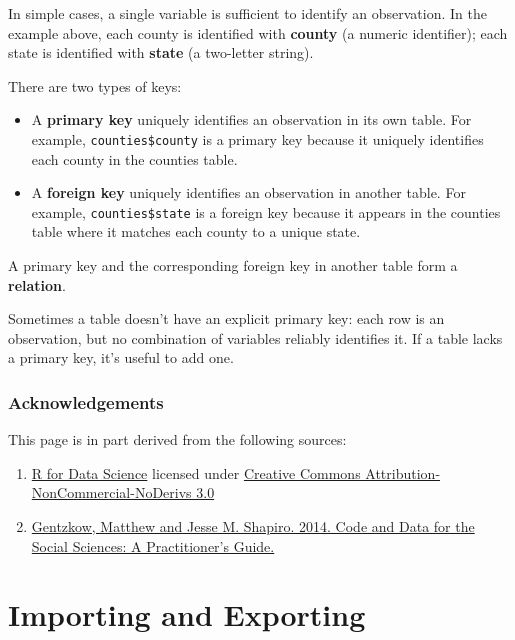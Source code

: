 \documentclass[]{book}
\begin{document}
In simple cases, a single variable is sufficient to identify an
observation. In the example above, each county is identified with
\textbf{county} (a numeric identifier); each state is identified with
\textbf{state} (a two-letter string).

There are two types of keys:

\begin{itemize}
\item
  A \textbf{primary key} uniquely identifies an observation in its own
  table. For example, \texttt{counties\$county} is a primary key because
  it uniquely identifies each county in the counties table.
\item
  A \textbf{foreign key} uniquely identifies an observation in another
  table. For example, \texttt{counties\$state} is a foreign key because
  it appears in the counties table where it matches each county to a
  unique state.
\end{itemize}

A primary key and the corresponding foreign key in another table form a
\textbf{relation}.

Sometimes a table doesn't have an explicit primary key: each row is an
observation, but no combination of variables reliably identifies it. If
a table lacks a primary key, it's useful to add one.

\subsubsection*{Acknowledgements}\label{acknowledgements-1}

This page is in part derived from the following sources:

\begin{enumerate}
\def\labelenumi{\arabic{enumi}.}
\item
  \href{https://r4ds.had.co.nz}{R for Data Science} licensed under
  \href{https://creativecommons.org/licenses/by-nc-nd/3.0/us/}{Creative
  Commons Attribution-NonCommercial-NoDerivs 3.0}
\item
  \href{https://web.stanford.edu/~gentzkow/research/CodeAndData.pdf}{Gentzkow,
  Matthew and Jesse M. Shapiro. 2014. Code and Data for the Social
  Sciences: A Practitioner's Guide.}
\end{enumerate}

\section{Importing and Exporting}\label{importing-and-exporting}
\end{document}
